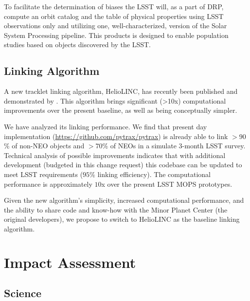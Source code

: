 \documentclass[DM,authoryear,toc,lsstdraft]{lsstdoc}
\begin{document}
To facilitate the determination of biases the LSST will, as a part of DRP, compute an orbit catalog and the table of physical properties using LSST observations only and utilizing one, well-characterized, version of the Solar System Processing pipeline. This products is designed to enable population studies based on objects discovered by the LSST.

\subsection{Linking Algorithm}

A new tracklet linking algorithm, HelioLINC, has recently been published and demonstrated by \cite{2018AJ....156..135H}. This algorithm brings significant (>10x) computational improvements over the present baseline, as well as being conceptually simpler.

We have analyzed its linking performance. We find that present day implementation (\url{https://github.com/pytrax/pytrax}) is already able to link $> 90$\% of non-NEO objects and $> 70$\% of NEOs in a simulate 3-month LSST survey. Technical analysis of possible improvements indicates that with additional development (budgeted in this change request) this codebase can be updated to meet LSST requirements ($95$\% linking efficiency). The computational performance is approximately $10$x over the present LSST MOPS prototypes.

Given the new algorithm's simplicity, increased computational performance, and the ability to share code and know-how with the Minor Planet Center (the original developers), we propose to switch to HelioLINC as the baseline linking algorithm.

\section{Impact Assessment}

\subsection{Science}
\end{document}
